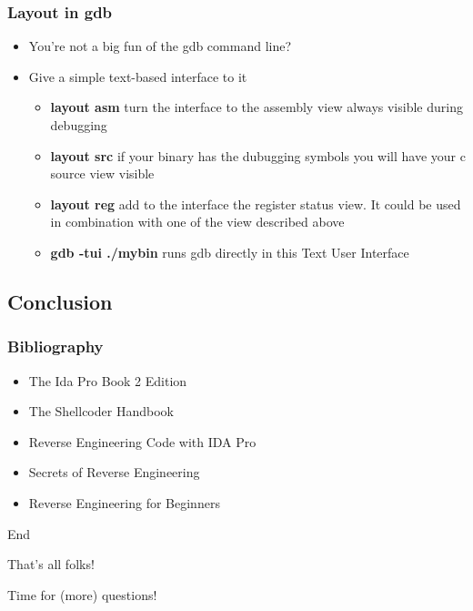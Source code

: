 \documentclass[]{beamer}
\begin{document}
\begin{frame}
  \frametitle{Layout in gdb}
  \begin{itemize}
  \item{You're not a big fun of the gdb command line?}
  \item{Give a simple text-based interface to it}
    \begin{itemize}
    \item{{\bf layout asm} turn the interface to the assembly view always visible during debugging}
    \item{{\bf layout src} if your binary has the dubugging symbols you will have your c source view visible}
    \item{{\bf layout reg} add to the interface the register status view. It could be used in combination with one of the view described above}
    \item{{\bf gdb -tui ./mybin} runs gdb directly in this Text User Interface}
    \end{itemize}
  \end{itemize}
\end{frame}

\subsection{Conclusion}
\begin{frame}
  \frametitle{Bibliography}
  \begin{itemize}
  \item The Ida Pro Book 2 Edition
  \item The Shellcoder Handbook
  \item Reverse Engineering Code with IDA Pro
  \item Secrets of Reverse Engineering
  \item Reverse Engineering for Beginners
  \end{itemize}
\end{frame}

\begin{frame}{End}
  \begin{center}\Large
    That's all folks!

    Time for (more) questions!
  \end{center}
\end{frame}
\end{document}
